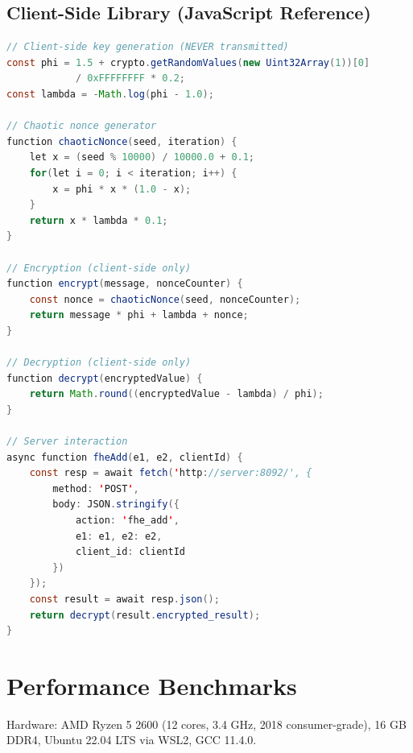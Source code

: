 \documentclass{article}
\begin{document}
\subsection{Client-Side Library (JavaScript Reference)}

\begin{lstlisting}[language=Java, basicstyle=\ttfamily\footnotesize, frame=single]
// Client-side key generation (NEVER transmitted)
const phi = 1.5 + crypto.getRandomValues(new Uint32Array(1))[0] 
            / 0xFFFFFFFF * 0.2;
const lambda = -Math.log(phi - 1.0);

// Chaotic nonce generator
function chaoticNonce(seed, iteration) {
    let x = (seed % 10000) / 10000.0 + 0.1;
    for(let i = 0; i < iteration; i++) {
        x = phi * x * (1.0 - x);
    }
    return x * lambda * 0.1;
}

// Encryption (client-side only)
function encrypt(message, nonceCounter) {
    const nonce = chaoticNonce(seed, nonceCounter);
    return message * phi + lambda + nonce;
}

// Decryption (client-side only)
function decrypt(encryptedValue) {
    return Math.round((encryptedValue - lambda) / phi);
}

// Server interaction
async function fheAdd(e1, e2, clientId) {
    const resp = await fetch('http://server:8092/', {
        method: 'POST',
        body: JSON.stringify({
            action: 'fhe_add',
            e1: e1, e2: e2,
            client_id: clientId
        })
    });
    const result = await resp.json();
    return decrypt(result.encrypted_result);
}
\end{lstlisting}

\section{Performance Benchmarks}

Hardware: AMD Ryzen 5 2600 (12 cores, 3.4 GHz, 2018 consumer-grade), 16 GB DDR4, Ubuntu 22.04 LTS via WSL2, GCC 11.4.0.
\end{document}
